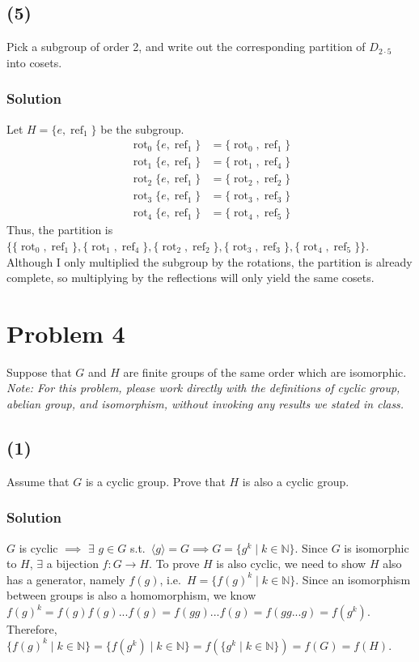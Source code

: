 \documentclass[fleqn]{article}
\DeclareMathOperator{\rot}{rot}
\DeclareMathOperator{\refl}{ref}
\begin{document}
        \subsection{(5)}
        Pick a subgroup of order 2, and write out the corresponding partition of $D_{2 \cdot 5}$ into cosets.
            
            \subsubsection{Solution}
            Let $H = \{e, \refl_1\}$ be the subgroup.
            \begin{align}
                \rot_0 \{e, \refl_1\} &= \{\rot_0, \refl_1\} \\
                \rot_1 \{e, \refl_1\} &= \{\rot_1, \refl_4\} \\
                \rot_2 \{e, \refl_1\} &= \{\rot_2, \refl_2\} \\
                \rot_3 \{e, \refl_1\} &= \{\rot_3, \refl_3\} \\
                \rot_4 \{e, \refl_1\} &= \{\rot_4, \refl_5\}
            \end{align}
            Thus, the partition is $\{\{\rot_0, \refl_1\}, \{\rot_1, \refl_4\}, \{\rot_2, \refl_2\}, \{\rot_3, \refl_3\}, \{\rot_4, \refl_5\}\}$.  Although I only multiplied the subgroup by the rotations, the partition is already complete, so multiplying by the reflections will only yield the same cosets.
        
    \section{Problem 4}
    Suppose that $G$ and $H$ are finite groups of the same order which are isomorphic.  \textit{Note: For this problem, please work directly with the definitions of cyclic group, abelian group, and isomorphism, without invoking any results we stated in class.}
        
        \subsection{(1)}
        Assume that $G$ is a cyclic group.  Prove that $H$ is also a cyclic group.
            
            \subsubsection{Solution}
            $G$ is cyclic $\implies$ $\exists$ $g \in G$ s.t.\ $\langle g \rangle = G \implies G = \{g^k \mid k \in \mathbb{N}\}$.  Since $G$ is isomorphic to $H$, $\exists$ a bijection $f: G \to H$.  To prove $H$ is also cyclic, we need to show $H$ also has a generator, namely $f(g)$, i.e.\ $H = \{f(g)^k \mid k \in \mathbb{N}\}$.  Since an isomorphism between groups is also a homomorphism, we know $f(g)^k = f(g)f(g)...f(g) = f(gg)...f(g) = f(gg...g) = f(g^k)$.  Therefore, $\{f(g)^k \mid k \in \mathbb{N}\} = \{f(g^k) \mid k \in \mathbb{N}\} = f(\{g^k \mid k \in \mathbb{N}\}) = f(G) = f(H)$.
        
\end{document}
